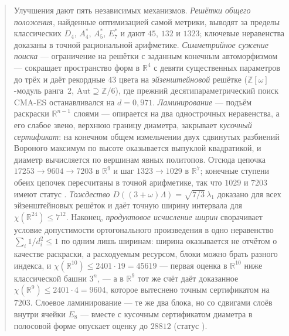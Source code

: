 \documentclass[11pt]{article}
\theoremstyle{definition}
\theoremstyle{remark}
\newcommand{\R}{\mathbb{R}}
\newcommand{\Z}{\mathbb{Z}}
\newcommand{\cyrbadge}[1]{{\fontencoding{T2A}\selectfont #1}}
\newcommand{\stC}{\textcolor{RoyalBlue}{\textbf{\cyrbadge{[С]}}}}       %
\newcommand{\stN}{\textcolor{BurntOrange}{\textbf{\cyrbadge{[Ч]}}}}     %
\begin{document}
\begin{abstract}
Улучшения дают пять независимых механизмов. \emph{Решётки общего положения},
найденные оптимизацией самой метрики, выводят за пределы классических $D_4$,
$A_4^*$, $A_5^*$, $E_7^*$ и дают $45$, $132$ и $1323$; ключевые неравенства
доказаны в точной рациональной арифметике. \emph{Симметрийное сужение поиска}
--- ограничение на решётки с заданным конечным автоморфизмом --- сокращает
пространство форм в $\R^4$ с девяти существенных параметров до трёх и
даёт рекордные $43$ цвета на \emph{эйзенштейновой} решётке
($\Z[\omega]$-модуль ранга~2, $\mathrm{Aut}\supseteq\Z/6$), где прежний
десятипараметрический поиск CMA-ES останавливался на $d=0{,}971$. \emph{Ламинирование} --- подъём
раскраски $\R^{n-1}$ слоями --- опирается на два однострочных неравенства, а его
слабое звено, верхнюю границу диаметра, закрывает \emph{кусочный сертификат}: на
конечном общем измельчении двух сдвинутых разбиений Вороного максимум по высоте
оказывается выпуклой квадратикой, и диаметр вычисляется по вершинам явных
политопов. Отсюда цепочка $17253\to9604\to7203$ в $\R^9$ и шаг $1323\to1029$
в $\R^7$; конечные ступени обеих цепочек пересчитаны в точной арифметике, так
что $1029$ и $7203$ имеют статус \stC. \emph{Тождество} $D((3+\omega)\Lambda)=
\sqrt{7/3}\,\lambda_1$ доказано для всех эйзенштейновых решёток и даёт точную
ширину интервала для $\chi(\R^{24})\le7^{12}$. Наконец, \emph{продуктовое исчисление ширин}
сворачивает условие допустимости ортогонального произведения в одно неравенство
$\sum_i 1/d_i^2\le1$ по одним лишь ширинам: ширина оказывается не отчётом о
качестве раскраски, а расходуемым ресурсом, блоки можно брать разного индекса, и
$\chi(\R^{10})\le2401\cdot19=45619$ --- первая оценка в $\R^{10}$ ниже
классической башни $3^n$, --- а в $\R^9$ тот же счёт даёт доказанное
$\chi(\R^9)\le2401\cdot4=9604$, которое вытеснено точным сертификатом
на $7203$. Слоевое ламинирование --- те же два блока,
но со сдвигами слоёв внутри ячейки $E_8$ --- вместе с кусочным сертификатом
диаметра в полосовой форме опускает оценку до $28812$ (статус \stN).


\end{abstract}
\end{document}
